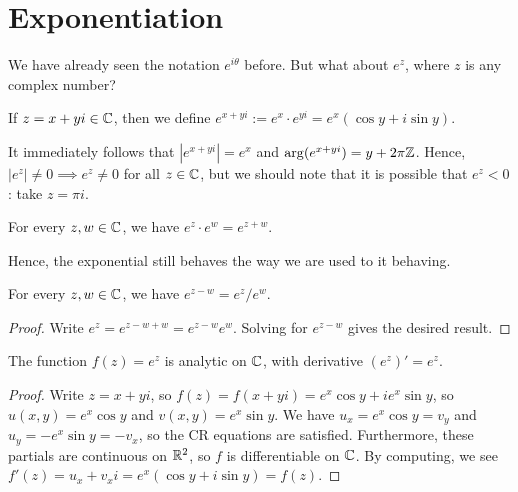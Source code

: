 \documentclass{article}
\begin{document}
\section{Exponentiation}
We have already seen the notation $e^{i\theta}$ before. But what about $e^z$, where $z$ is any complex number?
\begin{definition}
If $z = x+yi\in\mathbb C$, then we define $e^{x+yi} := e^x \cdot e^{yi} = e^x(\cos y + i\sin y)$.
\end{definition}
It immediately follows that $|e^{x+yi}| = e^x$ and $\arg(e^{x+yi}) = y+2\pi\mathbb Z$. Hence, $|e^z| \neq 0 \implies e^z\neq 0$ for all $z\in \mathbb C$, but we should note that it is possible that $e^z<0$: take $z=\pi i$.
\begin{proposition}
For every $z, w\in\mathbb C$, we have $e^z\cdot e^w = e^{z+ w}$.
\end{proposition}
Hence, the exponential still behaves the way we are used to it behaving.
\begin{corollary}
For every $z,w\in\mathbb C$, we have $e^{z-w} = e^z/e^w$.
\end{corollary}
\begin{proof}
Write $e^z = e^{z-w+w} = e^{z-w}e^w$. Solving for $e^{z-w}$ gives the desired result.
\end{proof}
\newpage
\begin{theorem}
The function $f(z) = e^z$ is analytic on $\mathbb C$, with derivative $(e^z)' = e^z$.
\end{theorem}
\begin{proof}
Write $z=x+yi$, so $f(z) = f(x+yi)= e^x\cos y + ie^x \sin y$, so $u(x,y) = e^x\cos y$ and $v(x,y) = e^x\sin y$. We have $u_x = e^x\cos y = v_y$ and $u_y = -e^x\sin y = -v_x$, so the CR equations are satisfied. Furthermore, these partials are continuous on $\mathbb R^2$, so $f$ is differentiable on $\mathbb C$. By computing, we see $f'(z) = u_x + v_xi = e^x(\cos y + i\sin y) = f(z)$.
\end{proof}
\setcounter{section}{36}
\end{document}
